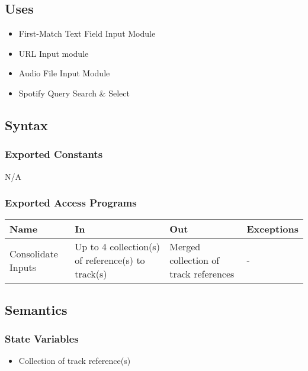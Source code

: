 \documentclass[12pt, titlepage]{article}
\begin{document}
\subsection{Uses}
\begin{itemize}
  \item First-Match Text Field Input Module
  \item URL Input module
  \item Audio File Input Module
  \item Spotify Query Search \& Select
\end{itemize}

\subsection{Syntax}

\subsubsection{Exported Constants}
N/A

\subsubsection{Exported Access Programs}

\begin{center}
\begin{tabular}{p{2cm} p{4cm} p{4cm} p{2cm}}
\hline
\textbf{Name} & \textbf{In} & \textbf{Out} & \textbf{Exceptions}\\
\hline%
Consolidate Inputs &Up to 4 collection(s) of reference(s) to track(s) &Merged collection of track references &-\\

\hline
\end{tabular}
\end{center}

\subsection{Semantics}

\subsubsection{State Variables}
\begin{itemize}
  \item Collection of track reference(s)
\end{itemize}
\end{document}
